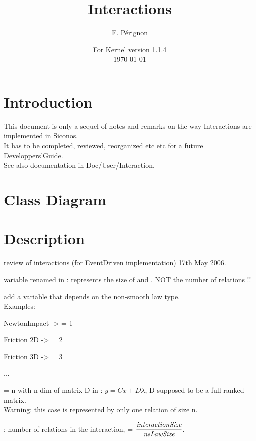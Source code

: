 \documentclass[10pt]{article}
\begin{document}
\thispagestyle{empty}
\title{Interactions}
\author{F. P\'erignon}

\date{For Kernel version 1.1.4 \\
 \today}
\maketitle

\pagestyle{fancy}

\section{Introduction}
This document is only a sequel of notes and remarks on the way Interactions are implemented in Siconos.\\
It has to be completed, reviewed, reorganized etc etc for a future Developpers'Guide. \\
See also documentation in Doc/User/Interaction.

\section{Class Diagram}

\section{Description}

\begin{ndrfp} 
review of interactions (for EventDriven implementation) 17th May 2006.
\end{ndrfp}

\bei
\item variable  renamed in : represents the size of  and \varcpp{$\lambda$}. NOT the number of relations !! \\
\item add a variable  that depends on the non-smooth law type.\\
Examples:
\bei
\item NewtonImpact ->  = 1
\item Friction 2D  ->  = 2
\item Friction 3D  ->  = 3
\item ... 
\item {} = n with n dim of matrix D in :
$y=Cx+D\lambda$, D supposed to be a full-ranked matrix. \\
Warning: this case is represented by only one relation of size n. 
\ei
\item {}: number of relations in the interaction,  = $\displaystyle \frac{\textit{interactionSize}}{\textit{nsLawSize}}$.
\ei
\end{document}
